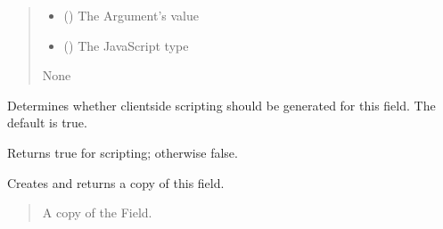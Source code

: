 \documentclass[letterpaper,10pt,english]{sphinxmanual}
\begin{document}
\begin{fulllineitems}
\begin{fulllineitems}
\begin{quote}
\begin{description}
\begin{itemize}
\item {} 
\sphinxAtStartPar
{} (\sphinxstyleliteralemphasis{\sphinxupquote{ | }}) \textendash{} The Argument’s value

\item {} 
\sphinxAtStartPar
{} (\sphinxstyleliteralemphasis{\sphinxupquote{ | }}) \textendash{} The JavaScript type

\end{itemize}

\sphinxAtStartPar
None

\end{description}\end{quote}

\end{fulllineitems}


\begin{fulllineitems}
\label{\detokenize{apache_commons_validator_python:apache_commons_validator_python.field_new.Field.client_validation}}
\pysigstartsignatures
{}
\pysigstopsignatures
\sphinxAtStartPar
Determines whether client\sphinxhyphen{}side scripting should be generated for this field.
The default is true.

\sphinxAtStartPar
Returns true for scripting; otherwise false.

\end{fulllineitems}


\begin{fulllineitems}
\label{\detokenize{apache_commons_validator_python:apache_commons_validator_python.field_new.Field.clone}}
\pysigstartsignatures
{}
\pysigstopsignatures
\sphinxAtStartPar
Creates and returns a copy of this field.
\begin{quote}\begin{description}
\sphinxAtStartPar
A copy of the Field.


\end{description}
\end{quote}
\end{fulllineitems}
\end{fulllineitems}
\end{document}
